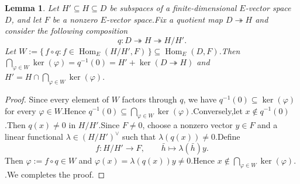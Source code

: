 \documentclass[10pt]{article}
\newtheorem{cor}[thm]{Corollary}
\newtheorem{lem}[thm]{Lemma}
\DeclareMathOperator{\Hom}{Hom}
\newcommand{\fil}{{\rm Fil}}
\newcommand{\bh}{{\mathbf{h}}}
\begin{document}
\begin{lem}\label{lem:recover-subspace-relative}
	Let $H'\subseteq H\subseteq D$ be subspaces of a finite-dimensional $E$-vector space $D$, and let $F$ be a
	nonzero $E$-vector space.\;Fix a quotient map $D\twoheadrightarrow H$ and consider the following composition 
	\[q:D\twoheadrightarrow H\twoheadrightarrow H/H'.\]
	Let $W:=\{\,f\circ q:f\in\Hom_E(H/H',F)\,\}
	\subseteq\Hom_E(D,F)$.\;Then
	$	\bigcap_{\varphi\in W}\ker(\varphi)=q^{-1}(0)=H'+\ker(D\twoheadrightarrow H)$ 
	and $H'=H\cap\bigcap_{\varphi\in W}\ker(\varphi).$

\end{lem}

\begin{proof}
	Since every element of $W$ factors through $q$, we have $q^{-1}(0)\subseteq\ker(\varphi)$ for every $\varphi\in W$.\;Hence $q^{-1}(0)\subseteq
	\bigcap_{\varphi\in W}\ker(\varphi).$\;Conversely,\;let $x\notin q^{-1}(0)$.\;Then $q(x)\neq0$ in $H/H'$.\;Since $F\neq0$,\; choose a nonzero vector $y\in F$ and a linear functional $	\lambda\in(H/H')^\vee$	such that $	\lambda(q(x))\neq0$.\;Define
	\[
	f:H/H'\longrightarrow F,\qquad
	\bar h\longmapsto\lambda(\bar h)y.
	\]
	Then $\varphi:=f\circ q\in W$ and $	\varphi(x)=\lambda(q(x))y\neq0$.\;Hence $x\notin
	\bigcap_{\varphi\in W}\ker(\varphi).$.\;We completes the proof.\;
\end{proof}






\end{document}
